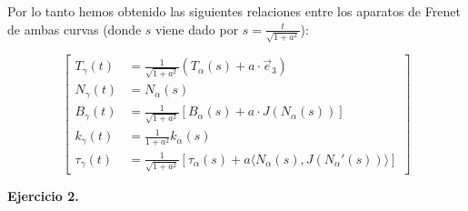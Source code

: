 \documentclass[fleqn]{article}
\begin{document}
    Por lo tanto hemos obtenido las siguientes relaciones entre los aparatos de Frenet de ambas curvas (donde $s$ viene dado por $s = \frac{t}{\sqrt{1+a^2}}$):

    $$
    \left[
        \begin{aligned}
            T_{\gamma}(t) &= \frac{1}{\sqrt{1 + a^2}} \left( T_{\alpha}\left(s\right) + a\cdot \vec{e}_3 \right)\\
            N_{\gamma}(t) &= N_{\alpha}\left(s\right)\\
            B_{\gamma}(t) &= \frac{1}{\sqrt{1 + a^2}} \left[ B_{\alpha}(s) + a\cdot J( N_{\alpha}(s)) \right]\\
            k_{\gamma}(t) &= \frac{1}{1 + a^2} k_{\alpha}(s)\\
            \tau_{\gamma}(t) &= \frac{1}{\sqrt{1 + a^2}} \left[ \tau_{\alpha}(s) + a \langle N_{\alpha}(s), J( N_{\alpha}'(s)) \rangle \right]        
        \end{aligned}
    \right]
    $$

    \newpage






















    \textbf{Ejercicio 2. } \\
    
\end{document}
